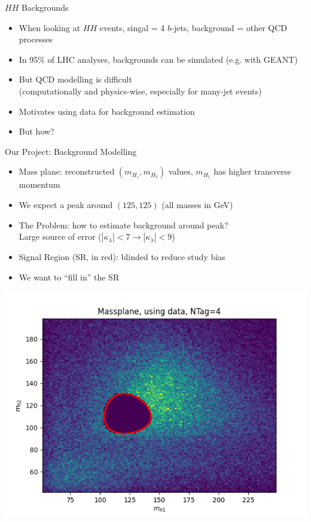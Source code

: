 \documentclass[10pt, aspectratio=169]{beamer}
\begin{document}
\begin{frame}{$HH$ Backgrounds}
  \begin{itemize}
    \item When looking at $HH$ events, singal = 4 $b$-jets, background = other QCD processes
    \item In 95\% of LHC analyses, backgrounds can be simulated
    (e.g. with GEANT)
    \item But QCD modelling is difficult\\
    (computationally and physics-wise, especially for many-jet events)
    \item Motivates using data for background estimation
    \item But how?
  \end{itemize}
\end{frame}


\begin{frame}{Our Project: Background Modelling}
  \begin{itemize}
    \item \alert{Mass plane}: reconstructed $(m_{H_1}, m_{H_2})$ values, $m_{H_1}$ has higher transverse momentum
    \item We expect a peak around $(125, 125)$ (all masses in GeV)
    \item \alert{The Problem}: how to estimate background around peak?\\
    Large source of error ($|\kappa_\lambda| < 7 \to |\kappa_\lambda| < 9$)
    \item Signal Region (SR, in red): blinded to reduce study bias
    \item We want to ``fill in'' the SR
  \end{itemize}
  \centering
  \includegraphics[width=0.35\linewidth, trim = 0 0 0 1.5cm, clip]{images/fullmassplane_4tag_data.png}
\end{frame}
\end{document}
